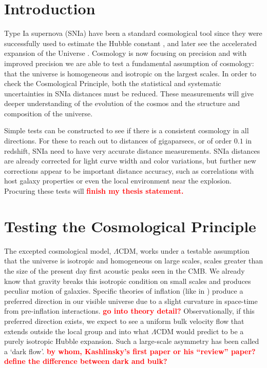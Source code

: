 \documentclass[apj, iop]{emulateapj}
\newcommand{\sn}{SNIa}
\newcommand{\todo}[1]{\textbf{\textcolor{red}{#1}}}
\begin{document}
\maketitle

\section{Introduction}\label{introduction} 

Type Ia supernova (\sn{}) have been a standard cosmological tool since they were
successfully used to estimate the Hubble constant \citep{Hamuy95,Riess95}, and
later see the accelerated expansion of the Universe
\citep{Riess98,Perlmutter99}. Cosmology is now focusing on precision and with
improved precision we are able to test a fundamental assumption of cosmology:
that the universe is homogeneous and isotropic on the largest scales. In order
to check the Cosmological Principle, both the statistical and systematic
uncertainties in \sn{} distances must be reduced. These measurements will give
deeper understanding of the evolution of the cosmos and the structure and
composition of the universe.

Simple tests can be constructed to see if there is a consistent cosmology in all
directions. For these to reach out to distances of gigaparsecs, or of order
$0.1$ in redshift, \sn{} need to have very accurate distance measurements. \sn{}
distances are already corrected for light curve width and color variations, but
further new corrections appear to be important distance accuracy, such as
correlations with host galaxy properties or even the local environment near the
explosion. Procuring these tests will \todo{finish my thesis statement.}

\section{Testing the Cosmological Principle}\label{testing-the-cosmological-principle}

The excepted cosmological model, $\Lambda$CDM, works under a testable assumption
that the universe is isotropic and homogeneous on large scales, scales greater
than the size of the present day first acoustic peaks seen in the CMB.
We already
know that gravity breaks this isotropic condition on small scales and produces
peculiar motion of galaxies. Specific theories of inflation (like in
\cite{MersiniHoughton:2008io}) produce a preferred direction in our visible
universe due to a slight curvature in space-time from pre-inflation
interactions. \todo{go into theory detail?} Observationally, if this preferred
direction exists, we expect to see a  uniform bulk velocity flow that extends
outside the local group and into what $\Lambda$CDM would predict to be a purely
isotropic Hubble expansion. Such a large-scale asymmetry has been called a `dark
flow'. 
\todo{by whom, Kashlinsky's first paper or his ``review'' paper?}
\todo{define the difference between dark and bulk?}
\end{document}
